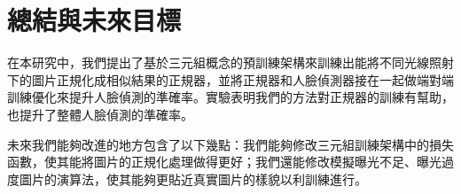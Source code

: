 \chapter{總結與未來目標}
\label{c:conclusion}

在本研究中，我們提出了基於三元組概念的預訓練架構來訓練出能將不同光線照射下的圖片正規化成相似結果的正規器，並將正規器和人臉偵測器接在一起做端對端訓練優化來提升人臉偵測的準確率。實驗表明我們的方法對正規器的訓練有幫助，也提升了整體人臉偵測的準確率。

未來我們能夠改進的地方包含了以下幾點：我們能夠修改三元組訓練架構中的損失函數，使其能將圖片的正規化處理做得更好；我們還能修改模擬曝光不足、曝光過度圖片的演算法，使其能夠更貼近真實圖片的樣貌以利訓練進行。
